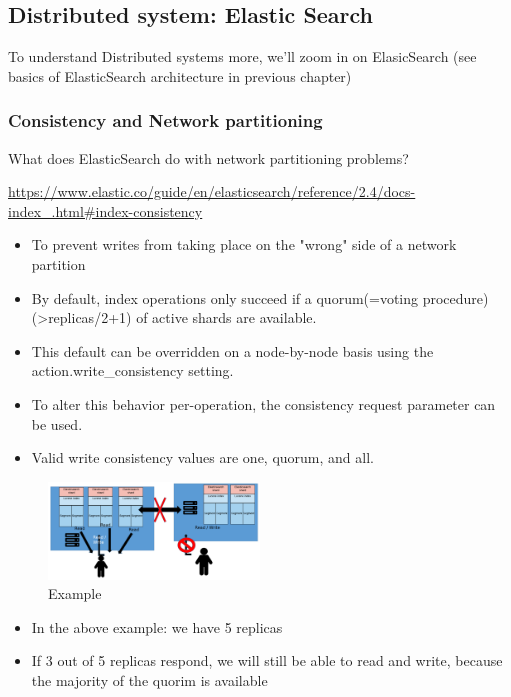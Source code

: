 \documentclass{article}
\begin{document}
\subsection{Distributed system: Elastic Search}

To understand Distributed systems more, we'll zoom in on ElasicSearch (see basics of ElasticSearch architecture in previous chapter)

\subsubsection{Consistency and Network partitioning}

What does ElasticSearch do with network partitioning problems?

\url{https://www.elastic.co/guide/en/elasticsearch/reference/2.4/docs-index\_.html#index-consistency}

\begin{itemize}
    \item To prevent writes from taking place on the "wrong" side of a network partition
    \item By default, index operations only succeed if a quorum(=voting procedure) (>replicas/2+1) of active shards are available. 
    \item This default can be overridden on a node-by-node basis using the action.write\_consistency setting. 
    \item To alter this behavior per-operation, the consistency request parameter can be used.
    \item Valid write consistency values are one, quorum, and all.
\end{itemize}


\begin{figure}[H]
    \centering
    \includegraphics[width=0.5\textwidth]{elasticsearch-distributed.png}
    \caption{Example}
\end{figure}

\begin{itemize}
    \item In the above example: we have 5 replicas
    \item If 3 out of 5 replicas respond, we will still be able to read and write, because the majority of the quorim is available
\end{itemize}
\end{document}

